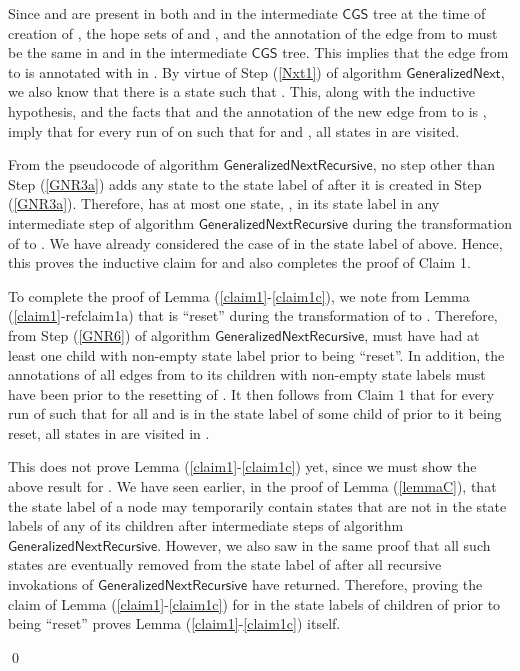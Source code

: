 \documentclass[3p]{elsarticle}
\newcommand{\CGS}{\ensuremath{\textsf{CGS }}}
\newcommand{\algo}[1]{\ensuremath{\textsf{{#1}}}}
\begin{document}
\begin{enumerate}
\begin{itemize}
      Since  and  are present in both  and in the
      intermediate \CGS tree at the time of creation of , the hope
      sets of  and , and the annotation of the edge from 
      to  must be the same in  and in the intermediate
      \CGS tree.  This implies that the edge from  to  is
      annotated with  in .  By virtue of Step
      (\ref{Nxt1}) of algorithm \algo{GeneralizedNext}, we also know
      that there is a state  such that
      .  This, along with the
      inductive hypothesis, and the facts that  and the annotation of the new edge from  to 
      is , imply that for every run  of  on
       such that  for  and , all states in
       are
      visited.

      From the pseudocode of algorithm
      \algo{GeneralizedNextRecursive}, no step other than Step
      (\ref{GNR3a}) adds any state to the state label of  after it
      is created in Step (\ref{GNR3a}).  Therefore,  has at most
      one state, , in its state label in any intermediate
      step of algorithm \algo{GeneralizedNextRecursive} during the
      transformation of  to .  We have already
      considered the case of  in the state label of 
      above.  Hence, this proves the inductive claim for  and
      also completes the proof of Claim 1.
    \end{itemize}

    To complete the proof of Lemma (\ref{claim1}-\ref{claim1c}), we
    note from Lemma (\ref{claim1}-ref{claim1a}) that  is ``reset''
    during the transformation of  to .  Therefore, from
    Step (\ref{GNR6}) of algorithm \algo{GeneralizedNextRecursive},
     must have had at least one child with non-empty state label
    prior to being ``reset''.  In addition, the annotations of all
    edges from  to its children with non-empty state labels must
    have been  prior to the resetting of .  It then follows from
    Claim 1 that for every run  of  such that  for all  and  is in
    the state label of some child of  prior to it being reset, all
    states in  are
    visited in .  

    This does not prove Lemma (\ref{claim1}-\ref{claim1c}) yet, since
    we must show the above result for .
    We have seen earlier, in the proof of Lemma (\ref{lemmaC}), that
    the state label of a node  may temporarily contain states that
    are not in the state labels of any of its children after
    intermediate steps of algorithm \algo{GeneralizedNextRecursive}.
    However, we also saw in the same proof that all such states are
    eventually removed from the state label of  after all recursive
    invokations of \algo{GeneralizedNextRecursive} have returned.
    Therefore, proving the claim of Lemma (\ref{claim1}-\ref{claim1c})
    for  in the state labels of children of  prior to
     being ``reset'' proves Lemma (\ref{claim1}-\ref{claim1c})
    itself. 
\end{enumerate}
\qed
\end{document}
